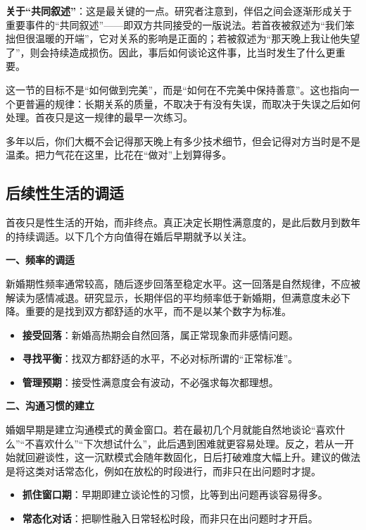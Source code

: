 \documentclass[12pt,UTF8]{ctexbook}
\begin{document}
\textbf{关于“共同叙述”}：这是最关键的一点。研究者注意到，伴侣之间会逐渐形成关于重要事件的“共同叙述”——即双方共同接受的一版说法。若首夜被叙述为“我们笨拙但很温暖的开端”，它对关系的影响是正面的；若被叙述为“那天晚上我让他失望了”，则会持续造成损伤。因此，事后如何谈论这件事，比当时发生了什么更重要。

这一节的目标不是“如何做到完美”，而是“如何在不完美中保持善意”。这也指向一个更普遍的规律：长期关系的质量，不取决于有没有失误，而取决于失误之后如何处理。首夜只是这一规律的最早一次练习。

\begin{tcolorbox}[colback=pink!5!white,colframe=red!50!black,title=贴心小叮咛]
多年以后，你们大概不会记得那天晚上有多少技术细节，但会记得对方当时是不是温柔。把力气花在这里，比花在“做对”上划算得多。
\end{tcolorbox}

\subsection{后续性生活的调适}

首夜只是性生活的开始，而非终点。真正决定长期性满意度的，是此后数月到数年的持续调适。以下几个方向值得在婚后早期就予以关注。

\textbf{一、频率的调适}

新婚期性频率通常较高，随后逐步回落至稳定水平。这一回落是自然规律，不应被解读为感情减退。研究显示，长期伴侣的平均频率低于新婚期，但满意度未必下降。重要的是找到双方都舒适的水平，而不是以某个数字为标准。

\begin{itemize}
\item \textbf{接受回落}：新婚高热期会自然回落，属正常现象而非感情问题。
\item \textbf{寻找平衡}：找双方都舒适的水平，不必对标所谓的“正常标准”。
\item \textbf{管理预期}：接受性满意度会有波动，不必强求每次都理想。
\end{itemize}

\textbf{二、沟通习惯的建立}

婚姻早期是建立沟通模式的黄金窗口。若在最初几个月就能自然地谈论“喜欢什么”“不喜欢什么”“下次想试什么”，此后遇到困难就更容易处理。反之，若从一开始就回避谈性，这一沉默模式会随年数固化，日后打破难度大幅上升。建议的做法是将这类对话常态化，例如在放松的时段进行，而非只在出问题时才提。

\begin{itemize}
\item \textbf{抓住窗口期}：早期即建立谈论性的习惯，比等到出问题再谈容易得多。
\item \textbf{常态化对话}：把聊性融入日常轻松时段，而非只在出问题时才开启。
\end{itemize}
\end{document}
